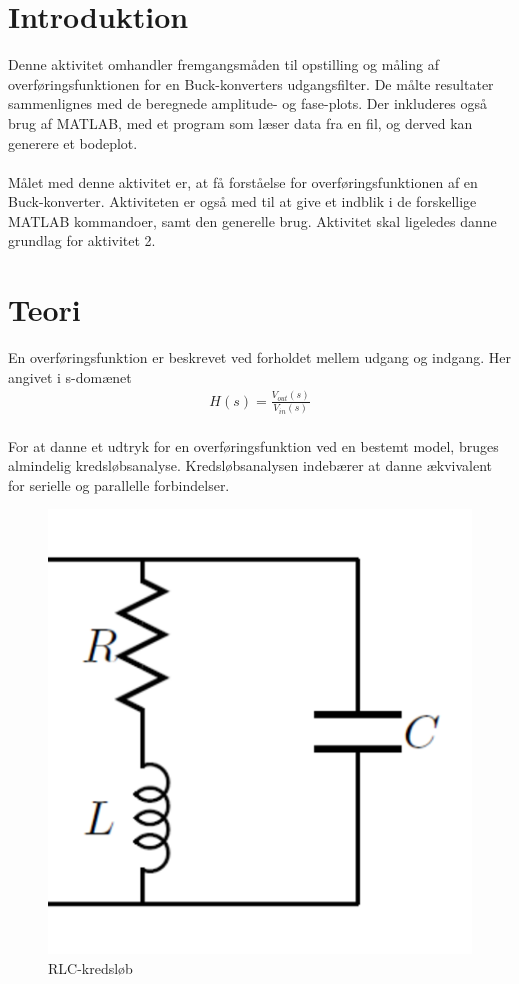 \section{Introduktion}\label{sec:intro}
Denne aktivitet omhandler fremgangsmåden til opstilling og måling af overføringsfunktionen for en Buck-konverters udgangsfilter. De målte resultater sammenlignes med de beregnede amplitude- og fase-plots. Der inkluderes også brug af MATLAB, med et program som læser data fra en fil, og derved kan generere et bodeplot. \\
\\
Målet med denne aktivitet er, at få forståelse for overføringsfunktionen af en Buck-konverter. 
Aktiviteten er også med til at give et indblik i de forskellige MATLAB kommandoer, samt den generelle brug. 
Aktivitet skal ligeledes danne grundlag for aktivitet 2. 

\section{Teori}\label{sec:teori}
En overføringsfunktion er beskrevet ved forholdet mellem udgang og indgang. Her angivet i s-domænet
\begin{align}
	H(s) = \frac{V_{out}(s)}{V_{in}(s)}
\end{align}
\\
For at danne et udtryk for en overføringsfunktion ved en bestemt model, bruges almindelig kredsløbsanalyse. Kredsløbsanalysen indebærer at danne ækvivalent for serielle og parallelle forbindelser.

\begin{figure}[h!]
	\centering
	\includegraphics[width=.2\textwidth]{reg1/rlc.png}
	\caption{RLC-kredsløb}
	\label{fig:rlc}
\end{figure}

